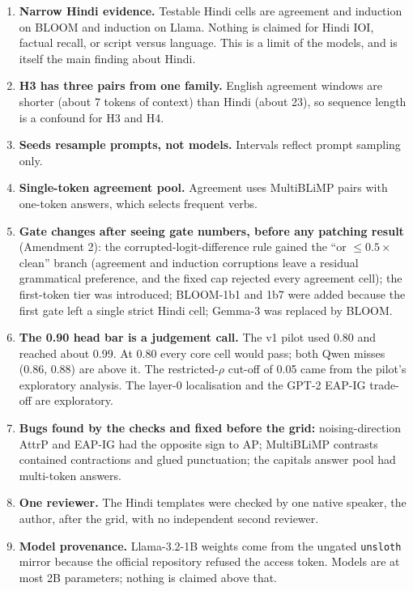 \documentclass[10pt,a4paper]{article}
\begin{document}
\begin{enumerate}
\item \textbf{Narrow Hindi evidence.} Testable Hindi cells are agreement and induction on BLOOM and induction on Llama. Nothing is claimed for Hindi IOI, factual recall, or script versus language. This is a limit of the models, and is itself the main finding about Hindi.
\item \textbf{H3 has three pairs from one family.} English agreement windows are shorter (about 7 tokens of context) than Hindi (about 23), so sequence length is a confound for H3 and H4.
\item \textbf{Seeds resample prompts, not models.} Intervals reflect prompt sampling only.
\item \textbf{Single-token agreement pool.} Agreement uses MultiBLiMP pairs with one-token answers, which selects frequent verbs.
\item \textbf{Gate changes after seeing gate numbers, before any patching result} (Amendment 2): the corrupted-logit-difference rule gained the ``or $\le0.5\times$ clean'' branch (agreement and induction corruptions leave a residual grammatical preference, and the fixed cap rejected every agreement cell); the first-token tier was introduced; BLOOM-1b1 and 1b7 were added because the first gate left a single strict Hindi cell; Gemma-3 was replaced by BLOOM.
\item \textbf{The 0.90 head bar is a judgement call.} The v1 pilot used 0.80 and reached about 0.99. At 0.80 every core cell would pass; both Qwen misses (0.86, 0.88) are above it. The restricted-$\rho$ cut-off of 0.05 came from the pilot's exploratory analysis. The layer-0 localisation and the GPT-2 EAP-IG trade-off are exploratory.
\item \textbf{Bugs found by the checks and fixed before the grid:} noising-direction AttrP and EAP-IG had the opposite sign to AP; MultiBLiMP contrasts contained contractions and glued punctuation; the capitals answer pool had multi-token answers.
\item \textbf{One reviewer.} The Hindi templates were checked by one native speaker, the author, after the grid, with no independent second reviewer.
\item \textbf{Model provenance.} Llama-3.2-1B weights come from the ungated \texttt{unsloth} mirror because the official repository refused the access token. Models are at most 2B parameters; nothing is claimed above that.
\end{enumerate}
\end{document}
